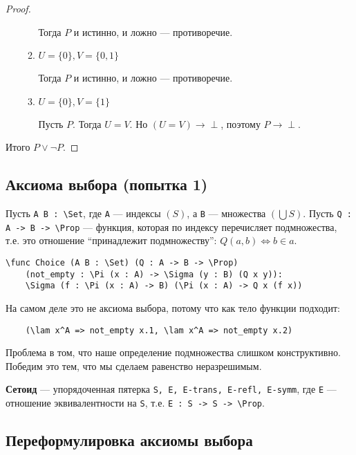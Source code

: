 \begin{proof}
\begin{enumerate}
\begin{enumerate}
                        Тогда \(P\) и истинно, и ложно --- противоречие.
                  \item \(U = \{0\}, V = \{0, 1\}\)

                        Тогда \(P\) и истинно, и ложно --- противоречие.
                  \item \(U = \{0\}, V = \{1\}\)

                        Пусть \(P\). Тогда \(U = V\). Но \((U = V) \to \perp\), поэтому \(P \to \perp\).
              \end{enumerate}
    \end{enumerate}

    Итого \(P \lor \neg P\).
\end{proof}

\subsection{Аксиома выбора (попытка 1)}

Пусть \verb!A B : \Set!, где \verb!A! --- индексы \((S)\), а \verb!B! --- множества \((\bigcup S)\). Пусть \verb!Q : A -> B -> \Prop! --- функция, которая по индексу перечисляет подмножества, т.е. это отношение ``принадлежит подмножеству'': \(Q(a, b) \Leftrightarrow b \in a\).

\begin{verbatim}
\func Choice (A B : \Set) (Q : A -> B -> \Prop)
    (not_empty : \Pi (x : A) -> \Sigma (y : B) (Q x y)):
    \Sigma (f : \Pi (x : A) -> B) (\Pi (x : A) -> Q x (f x))
\end{verbatim}

На самом деле это не аксиома выбора, потому что как тело функции подходит:
\begin{verbatim}
    (\lam x^A => not_empty x.1, \lam x^A => not_empty x.2)
\end{verbatim}

Проблема в том, что наше определение подмножества слишком конструктивно. Победим это тем, что мы сделаем равенство неразрешимым.

\begin{definition}
    \textbf{Сетоид} --- упорядоченная пятерка \texttt{S, E, E-trans, E-refl, E-symm}, где \texttt{E} --- отношение эквивалентности на \texttt{S}, т.е. \verb!E : S -> S -> \Prop!.
\end{definition}

\subsection{Переформулировка аксиомы выбора}

